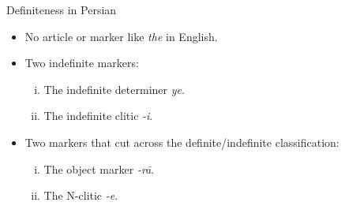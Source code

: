 \documentclass[10pt]{beamer}
\begin{document}
\begin {frame} {Definiteness in Persian}

\begin {itemize} 
	\item No article or marker like \emph{the} in English. \pause
	\item Two indefinite markers: 				
	\begin {enumerate} [i.]
		\item The indefinite determiner \emph{ye}.
		\item The indefinite clitic \emph{-i}.
	\end {enumerate} \pause
	\item Two markers that cut across the definite/indefinite classification:
	\begin {enumerate} [i.]
		\item The object marker \emph{-r\={a}}.
		\item The N-clitic \emph{-e}.
	\end {enumerate}
\end {itemize}

\end {frame}
\end{document}
